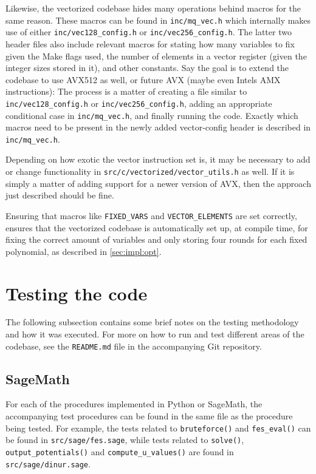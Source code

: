 Likewise, the vectorized codebase hides many operations behind macros for the same reason. These macros can be found in \texttt{inc/mq\_vec.h} which internally makes use of either \texttt{inc/vec128\_config.h} or \texttt{inc/vec256\_config.h}. The latter two header files also include relevant macros for stating how many variables to fix given the Make flags used, the number of elements in a vector register (given the integer sizes stored in it), and other constants. Say the goal is to extend the codebase to use AVX512 as well, or future AVX (maybe even Intels AMX instructions): The process is a matter of creating a file similar to \texttt{inc/vec128\_config.h} or \texttt{inc/vec256\_config.h}, adding an appropriate conditional case in \texttt{inc/mq\_vec.h}, and finally running the code. Exactly which macros need to be present in the newly added vector-config header is described in \texttt{inc/mq\_vec.h}. 

Depending on how exotic the vector instruction set is, it may be necessary to add or change functionality in \texttt{src/c/vectorized/vector\_utils.h} as well. If it is simply a matter of adding support for a newer version of AVX, then the approach just described should be fine.

Ensuring that macros like \texttt{FIXED\_VARS} and \texttt{VECTOR\_ELEMENTS} are set correctly, ensures that the vectorized codebase is automatically set up, at compile time, for fixing the correct amount of variables and only storing four rounds for each fixed polynomial, as described in \cref{sec:impl:opt}.

\section{Testing the code}
The following subsection contains some brief notes on the testing methodology and how it was executed. For more on how to run and test different areas of the codebase, see the \texttt{README.md} file in the accompanying Git repository.

\subsection{SageMath}

For each of the procedures implemented in Python or SageMath, the accompanying test procedures can be found in the same file as the procedure being tested. For example, the tests related to \texttt{bruteforce()} and \texttt{fes\_eval()} can be found in \texttt{src/sage/fes.sage}, while tests related to \texttt{solve()}, \texttt{output\_potentials()} and \texttt{compute\_u\_values()} are found in \texttt{src/sage/dinur.sage}.

